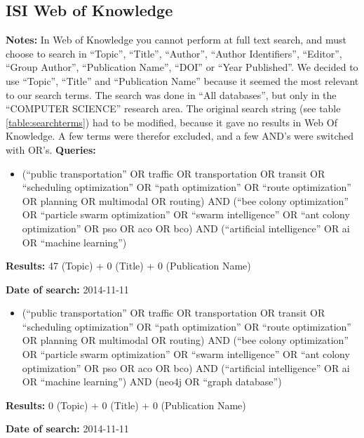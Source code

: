 \subsection{ISI Web of Knowledge}
\par \textbf{Notes:} In Web of Knowledge you cannot perform at full text search, and must choose to search in ``Topic'', ``Title'', ``Author'', ``Author Identifiers'', ``Editor'', ``Group Author'', ``Publication Name'', ``DOI'' or ``Year Published''. We decided to use ``Topic'', ``Title'' and ``Publication Name'' because it seemed the most relevant to our search terms. The search was done in ``All databases'', but only in the ``COMPUTER SCIENCE'' research area. The original search string (see table \ref{table:searchterms}) had to be modified, because it gave no results in Web Of Knowledge. A few terms were therefor excluded, and a few AND's were switched with OR's. 
\newline
\newline
\textbf{Queries:}
\begin{itemize}
	\item (``public transportation'' OR traffic OR transportation OR transit OR ``scheduling optimization'' OR ``path optimization'' OR ``route optimization'' OR planning OR multimodal OR routing) AND (``bee colony optimization'' OR ``particle swarm optimization'' OR ``swarm intelligence'' OR ``ant colony optimization'' OR pso OR aco OR bco) AND (``artificial intelligence'' OR ai OR ``machine learning'')
\end{itemize}
\par \textbf{Results:} 47 (Topic) + 0 (Title) + 0 (Publication Name)
\par \textbf{Date of search:} 2014-11-11 
\begin{itemize}
	\item (``public transportation'' OR traffic OR transportation OR transit OR ``scheduling optimization'' OR ``path optimization'' OR ``route optimization'' OR planning OR multimodal OR routing) AND (``bee colony optimization'' OR ``particle swarm optimization'' OR ``swarm intelligence'' OR ``ant colony optimization'' OR pso OR aco OR bco) AND (``artificial intelligence'' OR ai OR ``machine learning'') AND (neo4j OR ``graph database'')
\end{itemize}
\par \textbf{Results:} 0 (Topic) + 0 (Title) + 0 (Publication Name)
\par \textbf{Date of search:} 2014-11-11 


